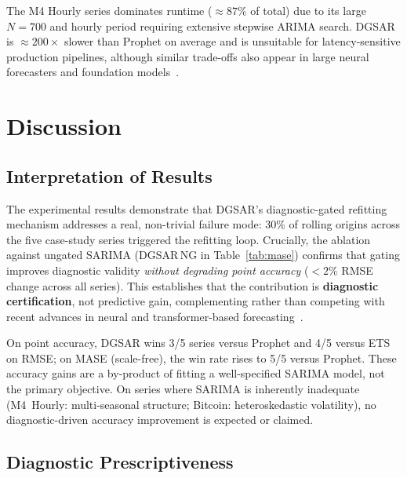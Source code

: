 \documentclass[sn-mathphys-num,pdflatex]{sn-jnl}
\begin{document}
The M4 Hourly series dominates runtime (${\approx}87\%$ of total) due
to its large $N{=}700$ and hourly period requiring extensive stepwise
ARIMA search. DGSAR is ${\approx}200\times$ slower than
Prophet on average and is unsuitable for latency-sensitive production
pipelines, although similar trade-offs also appear in large neural
forecasters and foundation models~\cite{oreshkin2019nbeats, challu2022nhits, zhou2021informer, wu2021autoformer, ansari2024chronos, das2024timesfm}.

\section{Discussion}
\label{sec:discussion}

\subsection{Interpretation of Results}

The experimental results demonstrate that DGSAR's
diagnostic-gated refitting mechanism addresses a real, non-trivial
failure mode: 30\% of rolling origins across the five case-study
series triggered the refitting loop. Crucially, the ablation
against ungated SARIMA (DGSAR\,NG in Table~\ref{tab:mase}) confirms
that gating improves diagnostic validity \emph{without degrading
point accuracy} ($<2\%$ RMSE change across all series). This
establishes that the contribution is \textbf{diagnostic certification},
not predictive gain, complementing rather than competing with recent
advances in neural and transformer-based forecasting~\cite{oreshkin2019nbeats, challu2022nhits, salinas2020deepar, lim2021tft, zhou2021informer, wu2021autoformer, nie2022patchtst, zhou2023itransformer, ansari2024chronos, das2024timesfm, jin2023timellm, kim2025deeplearningsurvey}.

On point accuracy, DGSAR wins 3/5 series versus Prophet and
4/5 versus ETS on RMSE; on MASE (scale-free), the win rate rises
to 5/5 versus Prophet. These accuracy gains are a by-product of
fitting a well-specified SARIMA model, not the primary objective.
On series where SARIMA is inherently inadequate (M4~Hourly:
multi-seasonal structure; Bitcoin: heteroskedastic volatility), no
diagnostic-driven accuracy improvement is expected or claimed.

\subsection{Diagnostic Prescriptiveness}
\end{document}
